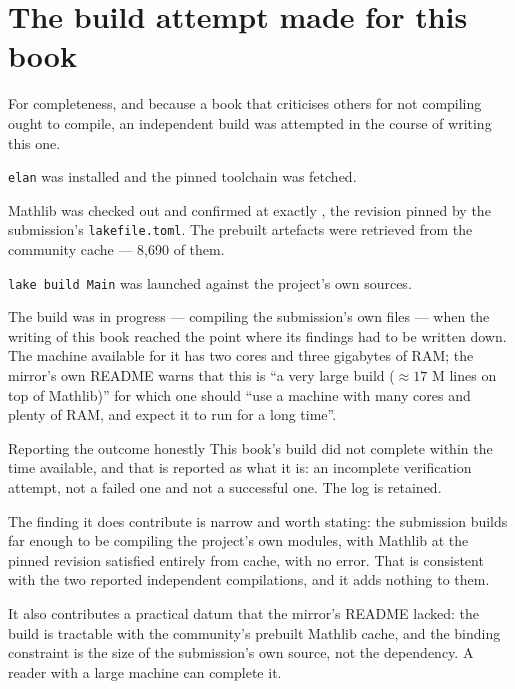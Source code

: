 \section{The build attempt made for this book}For completeness, and because a book that criticises others for not compiling
ought to compile, an independent build was attempted in the course of writing
this one.

\begin{description}[style=nextline,leftmargin=0pt,labelwidth=0pt,labelsep=0pt,font=\sffamily\bfseries\small,
  itemsep=5pt]
\item[The toolchain.] \texttt{elan} was installed and the pinned toolchain
 was fetched.
\item[The library.] Mathlib was checked out and confirmed at exactly
, the revision pinned by the
submission's \texttt{lakefile.toml}. The prebuilt artefacts were retrieved from
the community cache --- 8{,}690 of them.
\item[The build.] \texttt{lake build Main} was launched against the project's
own sources.
\end{description}

The build was in progress --- compiling the submission's own files --- when the
writing of this book reached the point where its findings had to be written
down. The machine available for it has two cores and three gigabytes of RAM;
the mirror's own README warns that this is ``a very large build ($\approx 17$
M lines on top of Mathlib)'' for which one should ``use a machine with many
cores and plenty of RAM, and expect it to run for a long time''.

\begin{seamnote}{Reporting the outcome honestly}
This book's build did not complete within the time available, and that is
reported as what it is: an incomplete verification attempt, not a failed one
and not a successful one. The log is retained.

The finding it does contribute is narrow and worth stating: the submission
builds far enough to be compiling the project's own modules, with Mathlib at
the pinned revision satisfied entirely from cache, with no error. That is
consistent with the two reported independent compilations, and it adds
nothing to them.

It also contributes a practical datum that the mirror's README lacked: the
build is tractable with the community's prebuilt Mathlib cache, and the
binding constraint is the size of the submission's own source, not the
dependency. A reader with a large machine can complete it.
\end{seamnote}

